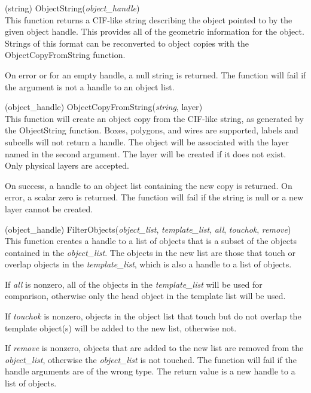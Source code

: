 \begin{description}
\item{(string) \vt ObjectString({\it object\_handle\/})}\\
This function returns a CIF-like string describing the object pointed
to by the given object handle.  This provides all of the geometric
information for the object.  Strings of this format can be reconverted
to object copies with the {\vt ObjectCopyFromString} function.

On error or for an empty handle, a null string is returned.  The
function will fail if the argument is not a handle to an object list.

\item{(object\_handle) \vt ObjectCopyFromString({\it string\/}, {\vt layer})}\\
This function will create an object copy from the CIF-like string, as
generated by the {\vt ObjectString} function.  Boxes, polygons, and
wires are supported, labels and subcells will not return a handle. 
The object will be associated with the layer named in the second
argument.  The layer will be created if it does not exist.  Only
physical layers are accepted.

On success, a handle to an object list containing the new copy is
returned.  On error, a scalar zero is returned.  The function will
fail if the string is null or a new layer cannot be created.

\item{(object\_handle) \vt FilterObjects({\it object\_list},
{\it template\_list}, {\it all\/}, {\it touchok}, {\it remove\/})}\\
This function creates a handle to a list of objects that is a subset
of the objects contained in the {\it object\_list}.  The objects in
the new list are those that touch or overlap objects in the {\it
template\_list}, which is also a handle to a list of objects.

If {\it all} is nonzero, all of the objects in the {\it
template\_list} will be used for comparison, otherwise only the head
object in the template list will be used.

If {\it touchok} is nonzero, objects in the object list that touch but
do not overlap the template object(s) will be added to the new list,
otherwise not.

If {\it remove} is nonzero, objects that are added to the new list are
removed from the {\it object\_list}, otherwise the {\it object\_list}
is not touched.  The function will fail if the handle arguments are of
the wrong type.  The return value is a new handle to a list of
objects.


\end{description}

